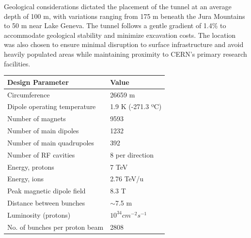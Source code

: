 Geological considerations dictated the placement of the tunnel at an average depth of 100 m, with variations ranging from 175 m beneath the Jura Mountains to 50 m near Lake Geneva. The tunnel follows a gentle gradient of 1.4\% to accommodate geological stability and minimize excavation costs. The location was also chosen to ensure minimal disruption to surface infrastructure and avoid heavily populated areas while maintaining proximity to CERN's primary research facilities.

\begin{table}[]
    \centering
    \begin{tabular}{|l|l|}
    \hline
    Design Parameter                & Value                                                                           \\ \hline
    Circumference                   & 26659 m                                                                        \\
    Dipole operating temperature    & 1.9 K (-271.3 ºC)                                                               \\
    Number of magnets               & 9593                                                                            \\
    Number of main dipoles          & 1232                                                                            \\
    Number of main quadrupoles      & 392                                                                             \\
    Number of RF cavities           & 8 per direction                                                                 \\
    Energy, protons                 & 7 TeV                                                                           \\
    Energy, ions                    & 2.76 TeV/u                                                                      \\
    Peak magnetic dipole field      & 8.3 T                                                                           \\
    Distance between bunches        & $\sim$7.5 m                                                                     \\
    Luminosity (protons)            & $10^{34} cm^{-2} s^{-1}$ \\
    No. of bunches per proton beam  & 2808                                                                            \\

\end{tabular}
\end{table}
